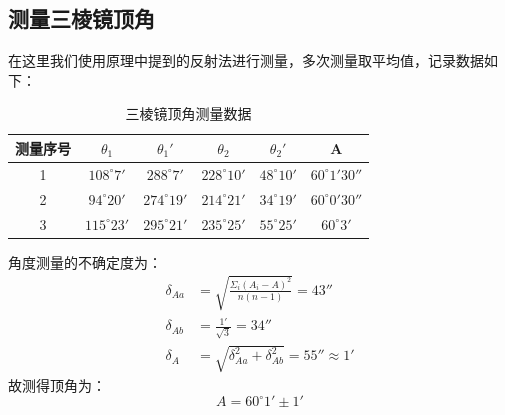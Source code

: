 \documentclass[UTF8]{ctexart}
\begin{document}
\subsection{测量三棱镜顶角}
在这里我们使用原理中提到的反射法进行测量，多次测量取平均值，记录数据如下：
\\
\begin{table}[h]
    \begin{center}
        \begin{tabular}{|c|c|c|c|c|c|}
            \hline
           测量序号 & \(\theta_1\) & \(\theta_1'\) & \(\theta_2\) & \(\theta_2'\) & A \\
            \hline
           1 & \(108^\circ 7'\) & \(288^\circ 7'\) & \(228^\circ 10'\) & \(48^\circ 10'\) & \(60^\circ 1'30''\) \\
            \hline
           2 & \(94^\circ 20'\) & \(274^\circ 19'\) & \(214^\circ 21'\) & \(34^\circ 19'\) & \(60^\circ 0'30''\) \\
            \hline
          3 & \(115^\circ 23'\) & \(295^\circ 21'\) & \(235^\circ 25'\) & \(55^\circ 25'\) & \(60^\circ 3'\) \\
            \hline
        \end{tabular}
        \caption{三棱镜顶角测量数据}
        \label{table:1}
    \end{center}  
\end{table}

角度测量的不确定度为：
\begin{align}
    \delta_{Aa} &=\sqrt{\frac{\Sigma_i (A_i-A)^2}{n(n-1)}}=43'' \\ \delta_{Ab}&=\frac{1'}{\sqrt3}=34'' \\ \delta_A&=\sqrt{\delta_{Aa}^2+\delta_{Ab}^2}=55''\approx 1'
\end{align}
故测得顶角为：
\[A=60^\circ 1' \pm 1' \]
\end{document}
